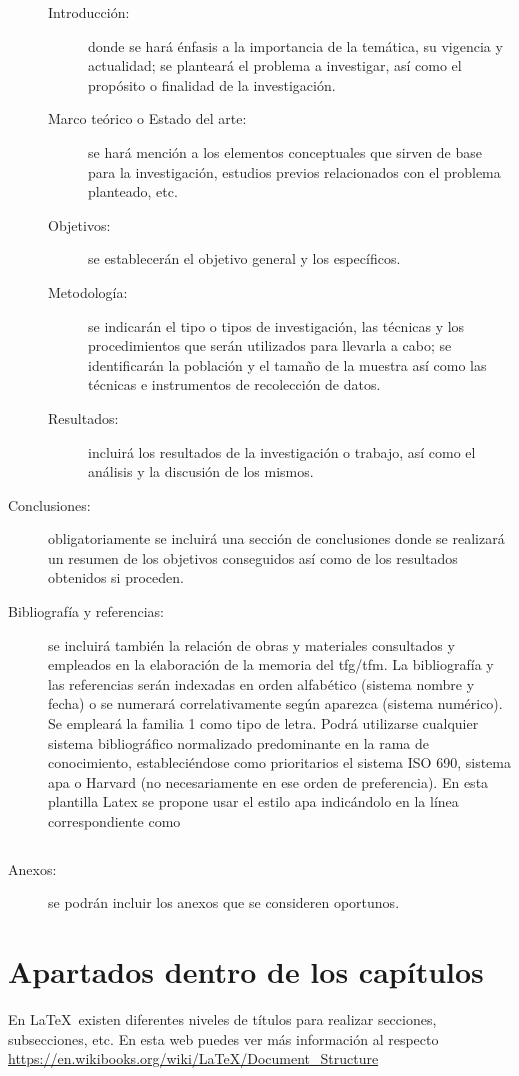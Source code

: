 \begin{description}
\begin{description}
\item[Introducción:] donde se hará énfasis a la importancia de la temática, su vigencia y actualidad; se planteará el problema a investigar, así como el propósito o finalidad de la investigación.
\item[Marco teórico o Estado del arte:] se hará mención a los elementos conceptuales que sirven de base para la investigación, estudios previos relacionados con el problema planteado, etc.
\item[Objetivos:] se establecerán el objetivo general y los específicos.
\item[Metodología:] se indicarán el tipo o tipos de investigación, las técnicas y los procedimientos que serán utilizados para llevarla a cabo; se identificarán la población y el tamaño de la muestra así como las técnicas e instrumentos de recolección de datos.
\item[Resultados:] incluirá los resultados de la investigación o trabajo, así como el análisis y la discusión de los mismos.
\end{description}
\item[Conclusiones:] obligatoriamente se incluirá una sección de conclusiones donde se realizará un resumen de los objetivos conseguidos así como de los resultados obtenidos si proceden.
\item[Bibliografía y referencias:] se incluirá también la relación de obras y materiales consultados y empleados en la elaboración de la memoria del \gls{tfg}/\gls{tfm}. La bibliografía y las referencias serán indexadas en orden alfabético (sistema nombre y fecha) o se numerará correlativamente según aparezca (sistema numérico). Se empleará la familia 1 como tipo de letra. Podrá utilizarse cualquier sistema bibliográfico normalizado predominante en la rama de conocimiento, estableciéndose como prioritarios el sistema ISO 690, sistema \gls{apa}  o Harvard (no necesariamente en ese orden de preferencia). En esta plantilla Latex se propone usar el estilo \gls{apa} indicándolo en la línea correspondiente como 
\begin{verbatim}

\end{verbatim}


\item[Anexos:] se podrán incluir los anexos que se consideren oportunos.

\end{description}

\section{Apartados dentro de los capítulos}
En \LaTeX~existen diferentes niveles de títulos para realizar secciones, subsecciones, etc. En esta web puedes ver más información al respecto \url{https://en.wikibooks.org/wiki/LaTeX/Document_Structure}

